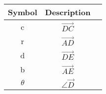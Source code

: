 \begin{tabular}{|c|c|c|}
\hline
Symbol & Description\\
\hline
c & $\vec{DC}$ \\
\hline
r & $\vec{AD}$ \\
\hline
d & $\vec{DE}$\\
\hline
b & $\vec{AE}$\\
\hline
$\theta$ & $\angle{\vec{D}}$ \\
\hline
\end{tabular}
